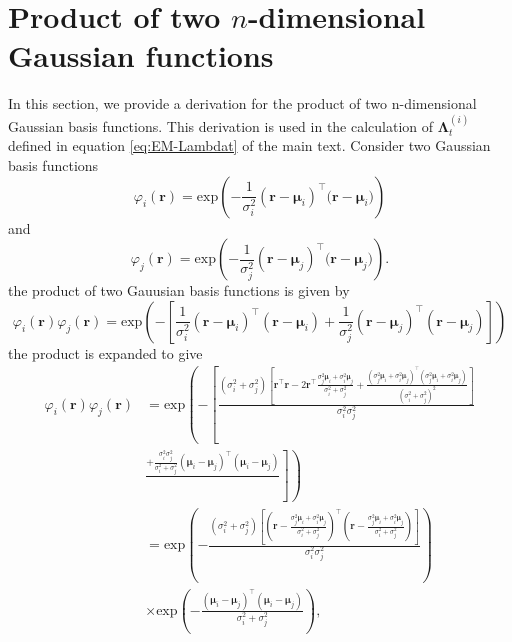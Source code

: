 \documentclass[]{article}
\begin{document}
\section{Product of two $n$-dimensional Gaussian functions}\label{sec:GaussianProduct} 
In this section, we provide a derivation for the product of two n-dimensional Gaussian basis functions.
This derivation is used in the  calculation of $\boldsymbol\Lambda_t^{(i)}$  defined in equation \eqref{eq:EM-Lambdat} of the main text. Consider two
Gaussian basis functions
\begin{equation}\label{eq:n_dimensional_Gaussian1}
 \varphi_i(\mathbf r)=\mathrm{exp}\left({-\frac{1}{\sigma_i^2} (\mathbf r-\boldsymbol \mu_i)^\top(\mathbf r-\boldsymbol \mu_i})\right)
\end{equation}
and 
\begin{equation}\label{eq:n_dimensional_Gaussian2}
\varphi_j(\mathbf r)=\mathrm{exp}\left({-\frac{1}{\sigma_j^2} (\mathbf r-\boldsymbol \mu_j)^\top(\mathbf r-\boldsymbol \mu_j})\right).
\end{equation}
the product of two Gauusian basis functions is given by
\begin{equation}
 \varphi_i(\mathbf r)\varphi_j(\mathbf r)=\mathrm{exp}\left(-\left[ {\frac{1}{\sigma_i^2} (\mathbf r-\boldsymbol \mu_i)^\top(\mathbf r-\boldsymbol\mu_i)+{\frac{1}{\sigma_j^2} (\mathbf r-\boldsymbol \mu_j)^\top(\mathbf r-\boldsymbol\mu_j)}}\right] \right)
\end{equation}
the product is expanded to give
\begin{align} 
 \varphi_i(\mathbf r)\varphi_j(\mathbf r)&=
\mathrm{exp}\left(-\left[ \frac{(\sigma_i^2+\sigma_j^2)\left[\mathbf r^\top\mathbf r-2\mathbf r^\top \frac{\sigma_j^2\boldsymbol\mu_i+\sigma_i^2\boldsymbol\mu_j}{\sigma_i^2+\sigma_j^2}+\frac{(\sigma_j^2\boldsymbol\mu_i+\sigma_i^2\boldsymbol\mu_j)^\top(\sigma_j^2\boldsymbol\mu_i+\sigma_i^2\boldsymbol\mu_j)}{(\sigma_i^2+\sigma_j^2)^2}\right]}{\sigma_i^2\sigma_j^2}\right.\right. \nonumber\\
&\left.\left. \frac{+\frac{\sigma_i^2\sigma_j^2}{\sigma_i^2+\sigma_j^2}(\boldsymbol \mu_i-\boldsymbol\mu_j)^\top(\boldsymbol \mu_i-\boldsymbol\mu_j)}{}\right]\right) \nonumber\\
  &=\mathrm{exp}\left(-\frac{(\sigma_i^2+\sigma_j^2)\left[(\mathbf r-\frac{\sigma_j^2\boldsymbol\mu_i+\sigma_i^2\boldsymbol\mu_j}{\sigma_i^2+\sigma_j^2})^\top(\mathbf r-\frac{\sigma_j^2\boldsymbol\mu_i+\sigma_i^2\boldsymbol\mu_j}{\sigma_i^2+\sigma_j^2})\right]  }{\sigma_i^2\sigma_j^2}\right) \nonumber \\
   &\times\mathrm{exp}\left(-\frac{(\boldsymbol \mu_i-\boldsymbol\mu_j)^\top(\boldsymbol \mu_i-\boldsymbol\mu_j)}{\sigma_i^2+\sigma_j^2}\right),
\end{align}
\end{document}
